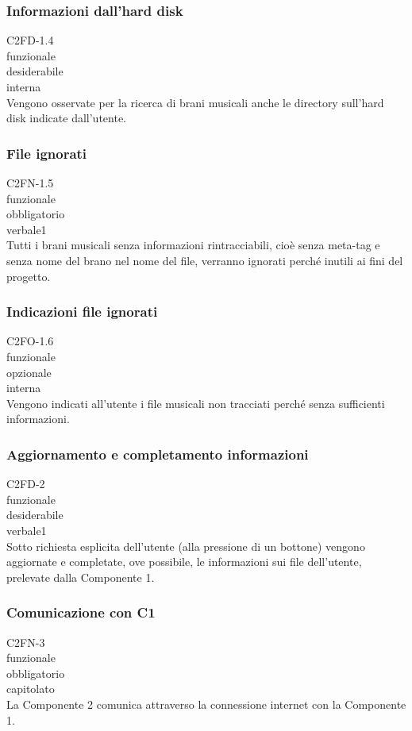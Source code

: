 \subsubsection*{Informazioni dall'hard disk}
 C2FD-1.4 \\
 funzionale \\
 desiderabile \\
 interna \\
Vengono osservate per la ricerca di brani musicali anche le directory sull'hard
disk indicate dall'utente.

\subsubsection*{File ignorati}
 C2FN-1.5 \\
 funzionale \\
 obbligatorio \\
 verbale1 \\
Tutti i brani musicali senza informazioni rintracciabili, cio\`e senza meta-tag e
senza nome del brano nel nome del file, verranno ignorati perch\'e inutili ai fini
del progetto.

\subsubsection*{Indicazioni file ignorati}
 C2FO-1.6 \\
 funzionale \\
 opzionale \\
 interna \\
Vengono indicati all'utente i file musicali non tracciati perch\'e senza
sufficienti informazioni.

\subsubsection*{Aggiornamento e completamento informazioni}
 C2FD-2 \\
 funzionale \\
 desiderabile \\
 verbale1 \\
Sotto richiesta esplicita dell'utente (alla pressione di un bottone) vengono
aggiornate e completate, ove possibile, le informazioni sui file dell'utente,
prelevate dalla Componente 1.

\subsubsection*{Comunicazione con C1}
 C2FN-3 \\
 funzionale \\
 obbligatorio \\
 capitolato \\
La Componente 2 comunica attraverso la connessione internet con la Componente 1.

